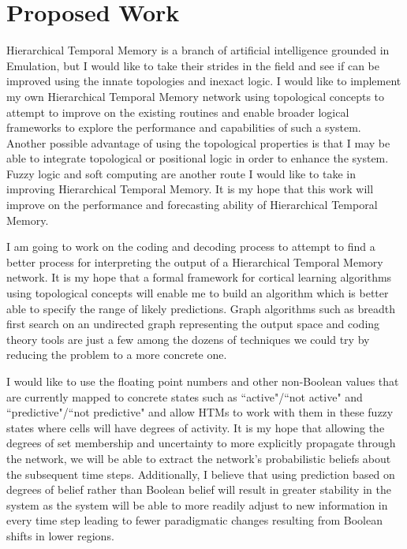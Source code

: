 \documentclass[fleqn,notitlepage,minimal]{article}
\begin{document}
	\section{Proposed Work}
	
	Hierarchical Temporal Memory is a branch of artificial intelligence grounded in Emulation, but I would like to take their strides in the field and see if can be improved using the innate topologies and inexact logic. I would like to implement my own Hierarchical Temporal Memory network using topological concepts to attempt to improve on the existing routines and enable broader logical frameworks to explore the performance and capabilities of such a system. Another possible advantage of using the topological properties is that I may be able to integrate topological or positional logic in order to enhance the system. Fuzzy logic and soft computing are another route I would like to take in improving Hierarchical Temporal Memory. It is my hope that this work will improve on the performance and forecasting ability of Hierarchical Temporal Memory.
	
	I am going to work on the coding and decoding process to attempt to find a better process for interpreting the output of a Hierarchical Temporal Memory network. It is my hope that a formal framework for cortical learning algorithms using topological concepts will enable me to build an algorithm which is better able to specify the range of likely predictions. Graph algorithms such as breadth first search on an undirected graph representing the output space and coding theory tools are just a few among the dozens of techniques we could try by reducing the problem to a more concrete one.
	
	I would like to use the floating point numbers and other non-Boolean values that are currently mapped to concrete states such as ``active"/``not active" and ``predictive"/``not predictive" and allow HTMs to work with them in these fuzzy states where cells will have degrees of activity. It is my hope that allowing the degrees of set membership and uncertainty to more explicitly propagate through the network, we will be able to extract the network's probabilistic beliefs about the subsequent time steps. Additionally, I believe that using prediction based on degrees of belief rather than Boolean belief will result in greater stability in the system as the system will be able to more readily adjust to new information in every time step leading to fewer paradigmatic changes resulting from Boolean shifts in lower regions.
	
\end{document}
